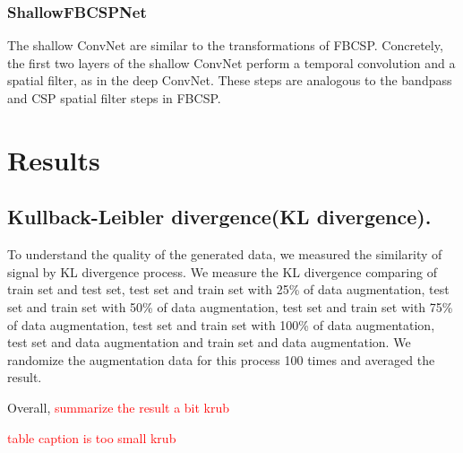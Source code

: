 \documentclass[runningheads]{llncs}
\begin{document}
\subsubsection{ShallowFBCSPNet}
The shallow ConvNet are similar to the transformations of FBCSP. Concretely, the first two layers of the shallow ConvNet perform a temporal convolution and a spatial filter, as in the deep ConvNet. These steps are analogous to the bandpass and CSP spatial filter steps in FBCSP.

\section{Results}

\subsection{Kullback-Leibler divergence(KL divergence).}

To understand the quality of the generated data, we measured the similarity of signal by KL divergence process. We measure the KL divergence comparing of train set and test set, test set and train set with 25\% of data augmentation, test set and train set with 50\% of data augmentation, test set and train set with 75\% of data augmentation, test set and train set with 100\% of data augmentation, test set and data augmentation and train set and data augmentation. We randomize the augmentation data for this process 100 times and averaged the result.

Overall, \textcolor{red}{summarize the result a bit krub}

\textcolor{red}{table caption is too small krub}
\end{document}
